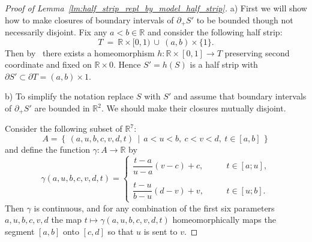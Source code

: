 \documentclass[12pt, reqno]{amsart}
\newcommand{\bR}{\mathbb{R}}
\newcommand\dif{h}
\newcommand{\strip}{S}
\begin{document}
\begin{proof}[Proof of Lemma~\ref{lm:half_strip_repl_by_model_half_strip}]
a) First we will show how to make closures of boundary intervals of $\partial_{+}\strip'$ to be bounded though not necessarily disjoint.
Fix any $a<b \in \bR$ and consider the following half strip:
\[
T \ = \ \bR\times[0,1)  \ \cup \ (a,b) \times \{1\}.
\]
Then by~\cite[Lemma~3.2]{MaksymenkoPolulyakh:PGC:2015} there exists a homeomorphism $\dif:\bR\times[0,1] \to T$ preserving second coordinate and fixed on $\bR\times 0$.
Hence $\strip' = \dif(\strip)$ is a half strip with $\partial \strip' \subset \partial T = (a,b)\times 1$.


b) To simplify the notation replace $\strip$ with $\strip'$ and assume that boundary intervals of $\partial_{+}\strip'$ are bounded in $\bR^2$.
We should make their closures mutually disjoint.

Consider the following subset of $\bR^{7}$:
\[
A=\left\lbrace\, (a,u,b,c,v,d,t) \, \mid \, a<u<b, \ c<v<d, \ t\in [a,b] \, \right\rbrace
\]
and define the function $\gamma: A \rightarrow \bR$ by
\[
\gamma(a,u,b,c,v,d,t) =
\begin{cases}
\dfrac{t-a}{u-a}(v-c)+c, & t \in [a;u], \\ 
\dfrac{t-u}{b-u}(d-v)+v, \phantom{\dfrac{A^{A^A}}{A^A}} & t \in [u;b].	
\end{cases}
\]
Then $\gamma$ is continuous, and for any combination of the first six parameters $a,u,b,c,v,d$ the map $t \mapsto \gamma(a,u,b,c,v,d,t)$ homeomorphically maps the segment $[a,b]$ onto $[c,d]$ so that $u$ is sent to $v$.


\end{proof}
\end{document}
